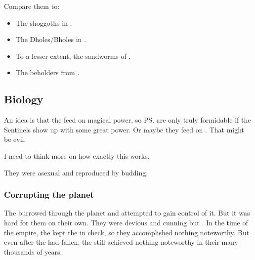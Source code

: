 Compare them to:
\begin{itemize}
  \item The shoggoths in \cite{HPLovecraft:AttheMountainsofMadness}.
  \item The Dholes/Bholes in \cite{HPLovecraft:TheDreamQuestofUnknownKadath}. 
  \item To a lesser extent, the sandworms of \cite{FrankHerbert:Dune}.
  \item The beholders from \cite{RPG:DungeonsandDragons}.
\end{itemize}











\subsection{Biology}
An idea is that the \noggyaleth{} feed on magical power, so \ps{\Teshrial} \noggyaleth{} are only truly formidable if the Sentinels show up with some great power. Or maybe they feed on \vertices. That might be evil. 

I need to think more on how exactly this works. 

They were asexual and reproduced by budding.





\subsubsection{Corrupting the planet}
The \noggyaleth burrowed through the planet and attempted to gain control of it.
But it was hard for them on their own.
They were devious and cunning but .
In the time of the \ophidian empire, the \ophidians kept the \noggyaleth in check, so they accomplished nothing noteworthy. 
But even after the \ophidians had fallen, the \noggyaleth still achieved nothing noteworthy in their many thousands of years. 

